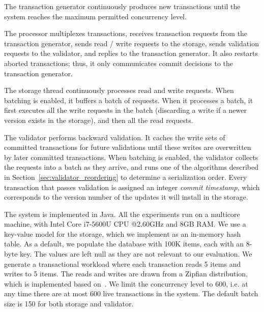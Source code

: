 The transaction generator continuously produces new transactions until the system reaches the maximum permitted concurrency level. 

The processor multiplexes transactions, receives transaction requests from the transaction generator, sends read / write requests to the storage, sends validation requests to the validator, and replies to the transaction generator. It also restarts aborted transactions; thus, it only communicates commit decisions to the transaction generator. 

The storage thread continuously processes read and write requests. When batching is enabled, it buffers a batch of requests. When it processes a batch, it first executes all the write requests in the batch (discarding a write if a newer version exists in the storage), and then all the read requests.

The validator performs backward validation. It caches the write sets of committed transactions for future validations until these writes are overwritten by later committed transactions. 
When batching is enabled, the validator collects the requests into a batch as they arrive, and runs one of the algorithms described in Section~\ref{sec:validator_reordering} to determine a serialization order. Every transaction that passes validation is assigned an integer \emph{commit timestamp}, which corresponds to the version number of the updates it will install in the storage.


The system is implemented in Java. All the experiments run on a multicore machine, with Intel Core i7-5600U CPU @2.60GHz and 8GB RAM. We use a key-value model for the storage, which we implement as an in-memory hash table. As a default, we populate the database with 100K items, each with an 8-byte key. The values are left null as they are not relevant to our evaluation. We generate a transactional workload where each transaction reads 5 items and writes to 5 items. The reads and writes are drawn from a Zipfian distribution, which is implemented based on~\cite{gray1994quickly}. We limit the concurrency level to 600, i.e. at any time there are at most 600 live transactions in the system. The default batch size is 150 for both storage and validator.

